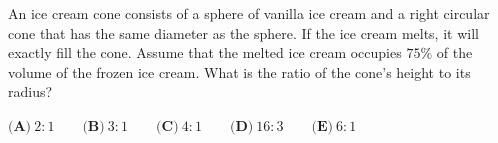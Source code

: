 An ice cream cone consists of a sphere of vanilla ice cream and a right circular cone that has the same diameter as the sphere. If the ice cream melts, it will exactly fill the cone. Assume that the melted ice cream occupies $75\%$ of the volume of the frozen ice cream. What is the ratio of the cone's height to its radius?

$\textbf{(A)}\ 2:1\qquad\textbf{(B)}\ 3:1\qquad\textbf{(C)}\ 4:1\qquad\textbf{(D)}\ 16:3\qquad\textbf{(E)}\ 6:1$
